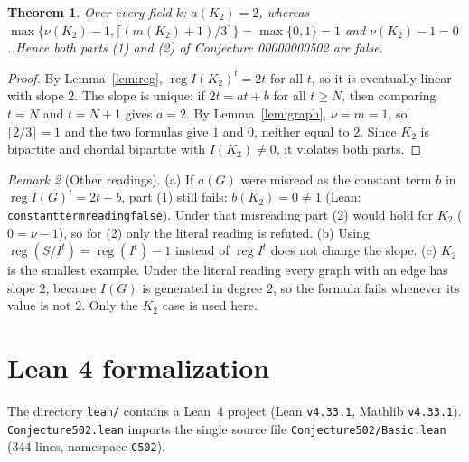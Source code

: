 \documentclass[11pt]{article}
\newtheorem{theorem}{Theorem}
\theoremstyle{definition}
\theoremstyle{remark}
\newtheorem{remark}[theorem]{Remark}
\renewcommand{\_}{\oldus\allowbreak}
\newcommand{\reg}{\operatorname{reg}}
\begin{document}
\begin{theorem}\label{thm:main}
Over every field $k$: $a(K_2) = 2$, whereas $\max\{\nu(K_2)-1, \lceil (m(K_2)+1)/3\rceil\} = \max\{0, 1\} = 1$
and $\nu(K_2) - 1 = 0$. Hence both parts (1) and (2) of Conjecture 00000000502 are false.
\end{theorem}
\begin{proof}
By Lemma~\ref{lem:reg}, $\reg I(K_2)^t = 2t$ for all $t$, so it is eventually linear with slope $2$.
The slope is unique: if $2t = at + b$ for all $t \ge N$, then comparing $t = N$ and $t = N+1$ gives
$a = 2$. By Lemma~\ref{lem:graph}, $\nu = m = 1$, so $\lceil 2/3 \rceil = 1$ and the two formulas give
$1$ and $0$, neither equal to $2$. Since $K_2$ is bipartite and chordal bipartite with $I(K_2) \ne 0$,
it violates both parts.
\end{proof}

\begin{remark}[Other readings]
(a) If $a(G)$ were misread as the constant term $b$ in $\reg I(G)^t = 2t + b$, part (1) still fails:
$b(K_2) = 0 \ne 1$ (Lean: \texttt{constant\_term\_reading\_false}). Under that misreading part (2) would
hold for $K_2$ ($0 = \nu - 1$), so for (2) only the literal reading is refuted.
(b) Using $\reg(S/I^t) = \reg(I^t) - 1$ instead of $\reg I^t$ does not change the slope.
(c) $K_2$ is the smallest example. Under the literal reading every graph with an edge has slope $2$,
because $I(G)$ is generated in degree $2$, so the formula fails whenever its value is not $2$. Only the
$K_2$ case is used here.
\end{remark}

\section{Lean 4 formalization}\label{sec:lean}

The directory \texttt{lean/} contains a Lean~4 project (Lean \texttt{v4.33.1}, Mathlib \texttt{v4.33.1}).
\texttt{Conjecture502.lean} imports the single source file \texttt{Conjecture502/Basic.lean}
(344 lines, namespace \texttt{C502}).
\end{document}
